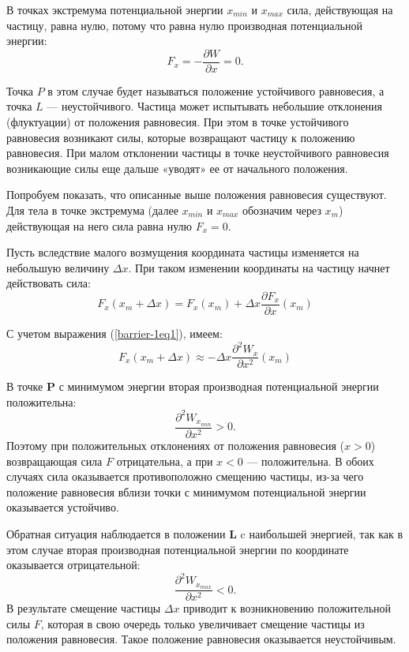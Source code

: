 \documentclass[14pt,a4paper,oneside]{extarticle}	%
\begin{document}
В точках экстремума потенциальной энергии $ x_{min} $ и $ x_{max} $ сила, действующая на частицу, равна нулю, потому что равна нулю производная потенциальной энергии:
\begin{equation}\label{barrier-1eq1}
F_{x} = -\frac{\partial W}{\partial x} = 0.
\end{equation}

Точка $ P $ в этом случае будет называться положение устойчивого равновесия, а точка $ L $ — неустойчивого. 
Частица может испытывать небольшие отклонения (флуктуации) от положения равновесия.
При этом в точке устойчивого равновесия возникают силы, которые возвращают частицу к положению равновесия. 
При малом отклонении частицы в точке неустойчивого равновесия возникающие силы еще дальше «уводят» ее от начального положения.

Попробуем показать, что описанные выше положения равновесия существуют.
Для тела в точке экстремума (далее $ x_{min} $ и $ x_{max} $ обозначим через $ x_{m} $) действующая на него сила равна нулю $ F_{x} = 0 $.

Пусть вследствие малого возмущения координата частицы изменяется на небольшую величину $ \Delta x $. 
При таком изменении координаты на частицу начнет действовать сила:
\begin{equation}\label{barrier-1eq2}
F_{x}(x_{m} + \Delta x) = F_{x}(x_{m}) + \Delta x \frac{\partial F_{x}}{\partial x}(x_{m})
\end{equation}

С учетом выражения (\ref{barrier-1eq1}), имеем:
\begin{equation}\label{barrier-1eq3}
F_{x}(x_{m} + \Delta x) \approx - \Delta x \frac{\partial^{2} W_{x}}{\partial x^{2}}(x_{m})
\end{equation}

В точке \textbf{P} с минимумом энергии вторая производная потенциальной энергии положительна: $$ \frac{\partial^{2} W_{x_{min}}}{\partial x^{2}} > 0.$$
Поэтому при положительных отклонениях от положения равновесия ($ x > 0 $) возвращающая сила $ F $ отрицательна, а при $ x<0 $ — положительна.
В обоих случаях сила оказывается противоположно смещению частицы, из-за чего положение равновесия вблизи точки с минимумом потенциальной энергии оказывается устойчиво.

Обратная ситуация наблюдается в положении \textbf{L} c наибольшей энергией, так как в этом случае вторая производная потенциальной энергии по координате оказывается отрицательной: $$ \frac{\partial^{2} W_{x_{max}}}{\partial x^{2}} < 0. $$ 
В результате смещение частицы  $ \Delta x $ приводит к возникновению положительной силы $ F $, которая в свою очередь только увеличивает смещение частицы из положения равновесия. 
Такое положение равновесия оказывается неустойчивым.
\end{document}
